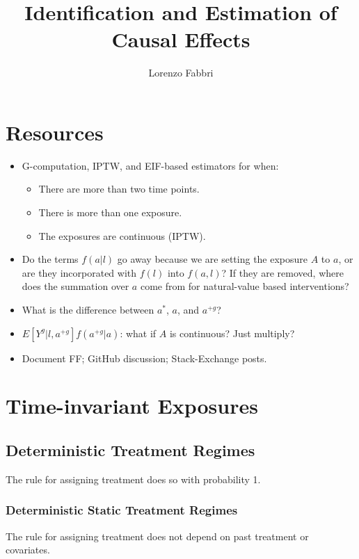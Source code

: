 \documentclass[12pt,twoside]{article}
\title{Identification and Estimation of Causal Effects}
\author{
    Lorenzo Fabbri
}
\begin{document}
\maketitle
\tableofcontents

\clearpage
\printglossaries
\clearpage

\section{Resources}
\begin{itemize}
    \item G-computation, IPTW, and EIF-based estimators for when:
    \begin{itemize}
        \item There are more than two time points.
        \item There is more than one exposure.
        \item The exposures are continuous (IPTW).
    \end{itemize}
    \item Do the terms $f(a|l)$ go away because we are setting the exposure $A$ to $a$, or are they incorporated with $f(l)$ into $f(a,l)$? If they are removed, where does the summation over $a$ come from for natural-value based interventions?
    \item What is the difference between $a^*$, $a$, and $a^{+g}$?
    \item $E[Y^g|l,a^{+g}]f(a^{+g}|a)$: what if $A$ is continuous? Just multiply?
    \item Document FF; GitHub discussion; Stack-Exchange posts.
\end{itemize}

\section{Time-invariant Exposures}

\subsection{Deterministic Treatment Regimes}
The rule for assigning treatment does so with probability 1.

\subsubsection{Deterministic Static Treatment Regimes}
The rule for assigning treatment does not depend on past treatment or covariates.
\end{document}
